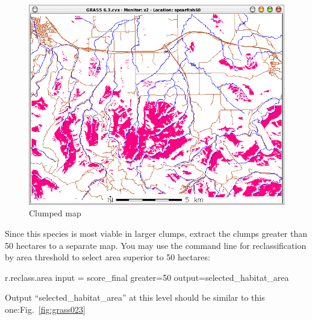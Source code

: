 \begin{figure}[htbp]
   \centering
   \includegraphics[scale=0.35]{grass022.png}
   \caption{Clumped map}
   \label{fig:grass022}
\end{figure}


Since this species is most viable in larger clumps, extract the clumps greater than 50 hectares to a separate map. You may use the command line for reclassification by area threshold to select area superior to 50 hectares:

\begin{smallverbatim}
r.reclass.area input = score_final greater=50 
 output=selected_habitat_area
\end{smallverbatim}

Output ``selected\_habitat\_area'' at this level should be similar to this one:Fig.~\ref{fig:grass023}


